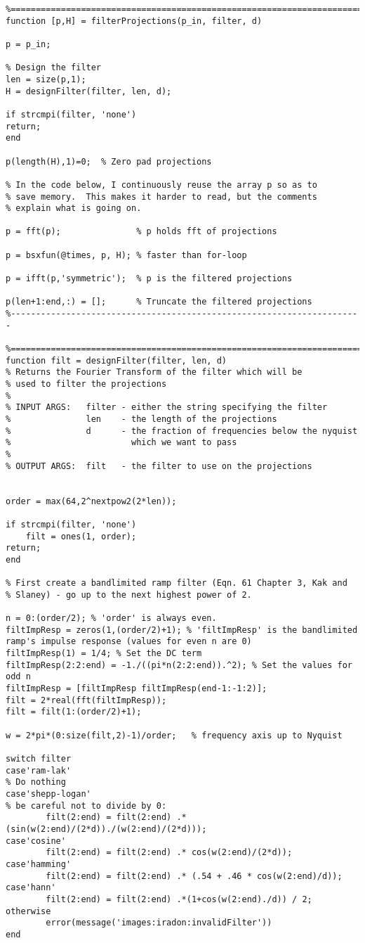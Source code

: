 \begin{lstlisting}
%======================================================================
function [p,H] = filterProjections(p_in, filter, d)

p = p_in;

% Design the filter
len = size(p,1);
H = designFilter(filter, len, d);

if strcmpi(filter, 'none')
return;
end

p(length(H),1)=0;  % Zero pad projections

% In the code below, I continuously reuse the array p so as to
% save memory.  This makes it harder to read, but the comments
% explain what is going on.

p = fft(p);               % p holds fft of projections

p = bsxfun(@times, p, H); % faster than for-loop

p = ifft(p,'symmetric');  % p is the filtered projections

p(len+1:end,:) = [];      % Truncate the filtered projections
%----------------------------------------------------------------------

%======================================================================
function filt = designFilter(filter, len, d)
% Returns the Fourier Transform of the filter which will be
% used to filter the projections
%
% INPUT ARGS:   filter - either the string specifying the filter
%               len    - the length of the projections
%               d      - the fraction of frequencies below the nyquist
%                        which we want to pass
%
% OUTPUT ARGS:  filt   - the filter to use on the projections


order = max(64,2^nextpow2(2*len));

if strcmpi(filter, 'none')
    filt = ones(1, order);
return;
end

% First create a bandlimited ramp filter (Eqn. 61 Chapter 3, Kak and
% Slaney) - go up to the next highest power of 2.

n = 0:(order/2); % 'order' is always even. 
filtImpResp = zeros(1,(order/2)+1); % 'filtImpResp' is the bandlimited ramp's impulse response (values for even n are 0)
filtImpResp(1) = 1/4; % Set the DC term 
filtImpResp(2:2:end) = -1./((pi*n(2:2:end)).^2); % Set the values for odd n
filtImpResp = [filtImpResp filtImpResp(end-1:-1:2)]; 
filt = 2*real(fft(filtImpResp)); 
filt = filt(1:(order/2)+1);

w = 2*pi*(0:size(filt,2)-1)/order;   % frequency axis up to Nyquist

switch filter
case'ram-lak'
% Do nothing
case'shepp-logan'
% be careful not to divide by 0:
        filt(2:end) = filt(2:end) .* (sin(w(2:end)/(2*d))./(w(2:end)/(2*d)));
case'cosine'
        filt(2:end) = filt(2:end) .* cos(w(2:end)/(2*d));
case'hamming'
        filt(2:end) = filt(2:end) .* (.54 + .46 * cos(w(2:end)/d));
case'hann'
        filt(2:end) = filt(2:end) .*(1+cos(w(2:end)./d)) / 2;
otherwise
        error(message('images:iradon:invalidFilter'))
end


\end{lstlisting}
